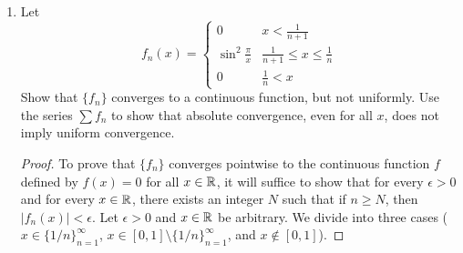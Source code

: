 \documentclass[../psets.tex]{subfiles}
\begin{document}
\begin{enumerate}[label={\textbf{\arabic*.}}]
\begin{proof}
        \underline{Non-uniform convergence intervals}: Any interval containing one or more of the points in the set $\{0\}\cup\{-1/n^2\}_{n=1}^\infty$, by the above.\par\medskip
        \underline{Points of continuity}: The series is continuous at all points at which it converges.\par
        Let $x$ be a point at which $f$ converges. Then by the first part of the proof, $x$ is an element of an open set $G$. Thus, let $N_{2r}(x)\subset G$, and consider $[x-r,x+r]$. By the above, $f$ converges uniformly on this interval. Additionally, each $f_n$ is continuous on this interval by definition. Thus, by Theorem 7.12, $f$ is continuous at $x$, as desired.\par\medskip
        \underline{Boundedness}: $f$ is not bounded.\par
        If we suppose for the sake of contradiction that $f$ is bounded by $m$, we nevertheless find that
        \begin{equation*}
            f(\tfrac{1}{4m^2}) > \sum_{n=1}^{2m}\frac{1}{1+\frac{n^2}{4m^2}}
            = \sum_{n=1}^{2m}\frac{(2m)^2}{(2m)^2+n^2}
            \geq \sum_{n=1}^{2m}\frac{(2m)^2}{(2m)^2+(2m)^2}
            = \sum_{n=1}^{2m}\frac{1}{2}
            = m
        \end{equation*}
    \end{proof}
    \item Let
    \begin{equation*}
        f_n(x) =
        \begin{cases}
            0 & x<\frac{1}{n+1}\\
            \sin^2\frac{\pi}{x} & \frac{1}{n+1}\leq x\leq\frac{1}{n}\\
            0 & \frac{1}{n}<x
        \end{cases}
    \end{equation*}
    Show that $\{f_n\}$ converges to a continuous function, but not uniformly. Use the series $\sum f_n$ to show that absolute convergence, even for all $x$, does not imply uniform convergence.
    \begin{proof}
        To prove that $\{f_n\}$ converges pointwise to the continuous function $f$ defined by $f(x)=0$ for all $x\in\mathbb{R}$, it will suffice to show that for every $\epsilon>0$ and for every $x\in\mathbb{R}$, there exists an integer $N$ such that if $n\geq N$, then $|f_n(x)|<\epsilon$. Let $\epsilon>0$ and $x\in\mathbb{R}$ be arbitrary. We divide into three cases ($x\in\{1/n\}_{n=1}^\infty$, $x\in[0,1]\setminus\{1/n\}_{n=1}^\infty$, and $x\notin[0,1]$).\par\smallskip

\end{proof}
\end{enumerate}
\end{document}
